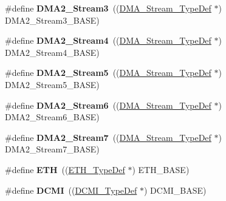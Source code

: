 \begin{DoxyCompactItemize}
\item 
\mbox{\label{group___peripheral__declaration_gaa6ead6a5ca6b8df70b5505aaeec6fd2e}} 
\#define {\bfseries D\+M\+A2\+\_\+\+Stream3}~((\hyperlink{struct_d_m_a___stream___type_def}{D\+M\+A\+\_\+\+Stream\+\_\+\+Type\+Def} $\ast$) D\+M\+A2\+\_\+\+Stream3\+\_\+\+B\+A\+SE)
\item 
\mbox{\label{group___peripheral__declaration_gae32674772021620800275dd3b6d62c2f}} 
\#define {\bfseries D\+M\+A2\+\_\+\+Stream4}~((\hyperlink{struct_d_m_a___stream___type_def}{D\+M\+A\+\_\+\+Stream\+\_\+\+Type\+Def} $\ast$) D\+M\+A2\+\_\+\+Stream4\+\_\+\+B\+A\+SE)
\item 
\mbox{\label{group___peripheral__declaration_gac40f58718761251875b5a897287efd83}} 
\#define {\bfseries D\+M\+A2\+\_\+\+Stream5}~((\hyperlink{struct_d_m_a___stream___type_def}{D\+M\+A\+\_\+\+Stream\+\_\+\+Type\+Def} $\ast$) D\+M\+A2\+\_\+\+Stream5\+\_\+\+B\+A\+SE)
\item 
\mbox{\label{group___peripheral__declaration_ga11a00b283e0911cd427e277e5a314ccc}} 
\#define {\bfseries D\+M\+A2\+\_\+\+Stream6}~((\hyperlink{struct_d_m_a___stream___type_def}{D\+M\+A\+\_\+\+Stream\+\_\+\+Type\+Def} $\ast$) D\+M\+A2\+\_\+\+Stream6\+\_\+\+B\+A\+SE)
\item 
\mbox{\label{group___peripheral__declaration_gacc135dbca0eca67d5aa0abc555f053ce}} 
\#define {\bfseries D\+M\+A2\+\_\+\+Stream7}~((\hyperlink{struct_d_m_a___stream___type_def}{D\+M\+A\+\_\+\+Stream\+\_\+\+Type\+Def} $\ast$) D\+M\+A2\+\_\+\+Stream7\+\_\+\+B\+A\+SE)
\item 
\mbox{\label{group___peripheral__declaration_ga3a3f60de4318afbd0b3318e7a416aadc}} 
\#define {\bfseries E\+TH}~((\hyperlink{struct_e_t_h___type_def}{E\+T\+H\+\_\+\+Type\+Def} $\ast$) E\+T\+H\+\_\+\+B\+A\+SE)
\item 
\mbox{\label{group___peripheral__declaration_ga049d9f61cb078d642e68f3c22bb6d90c}} 
\#define {\bfseries D\+C\+MI}~((\hyperlink{struct_d_c_m_i___type_def}{D\+C\+M\+I\+\_\+\+Type\+Def} $\ast$) D\+C\+M\+I\+\_\+\+B\+A\+SE)

\end{DoxyCompactItemize}
